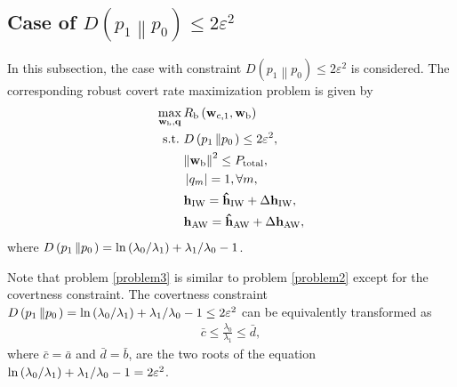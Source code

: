 \documentclass[10pt,journal,letterpaper,twocolumn,twoside]{IEEEtran} %
\begin{document}
\subsection{Case of $D\left( {{p_1}\left\| {{p_0}} \right.} \right) \le 2{\varepsilon ^2}$}
In this subsection, the case with constraint $D\left( {{p_1}\left\| {{p_0}} \right.} \right) \le 2{\varepsilon ^2}$ is considered. The   corresponding robust covert rate maximization problem is  given by
\begin{subequations}\label{problem3}
\begin{align}
\mathop {\max }\limits_{{{\bf{w}}_{\rm{b}}},{\bf{q}}} {\rm{ }}&{R_{\rm{b}}}\left( {{{\bf{w}}_{{\rm{c}},1}}},{{{\bf{w}}_{{\rm{b}}}}} \right) \hfill \\
  {\text{s}}{\text{.t}}{\text{.}}~&D\left( {{p_1}\left\| {{p_0}} \right.} \right) \le 2{\varepsilon ^2}, \hfill \label{problem3a}\\
 & {\left\| {{{\mathbf{w}}_{\rm{b}}}} \right\|^2} \le  {P_{{\rm{total}}}}, \hfill \label{problem3b}\\
 &\left| {{q_m}} \right| = 1,\forall m,\label{problem3c}\\
&{{\bf{h}}_{\rm{IW}}} = {{{\bf{\hat h}}}_{\rm{IW}}} + \Delta {{\bf{h}}_{\rm{IW}}},\label{problem3d}\\
 &{{\bf{h}}_{\rm{AW}}} = {{{\bf{\hat h}}}_{\rm{AW}}} + \Delta {{\bf{h}}_{\rm{AW}}},\label{problem3e}
\end{align}
\end{subequations}
where $D\left( {{p_1}\left\| {{p_0}} \right.} \right) = \ln \left( {{{{\lambda _0}} \mathord{\left/
 {\vphantom {{{\lambda _0}} {{\lambda _1}}}} \right.
 \kern-\nulldelimiterspace} {{\lambda _1}}}} \right) + {{{\lambda _{\rm{1}}}} \mathord{\left/
 {\vphantom {{{\lambda _{\rm{1}}}} {{\lambda _{\rm{0}}}}}} \right.
 \kern-\nulldelimiterspace} {{\lambda _{\rm{0}}}}} - 1$.

Note that problem \eqref{problem3}
 is similar to problem \eqref{problem2} except for the covertness constraint.
The covertness constraint $D\left( {{p_1}\left\| {{p_0}} \right.} \right) = \ln \left( {{{{\lambda _0}} \mathord{\left/
 {\vphantom {{{\lambda _0}} {{\lambda _1}}}} \right.
 \kern-\nulldelimiterspace} {{\lambda _1}}}} \right) + {{{\lambda _{\rm{1}}}} \mathord{\left/
 {\vphantom {{{\lambda _{\rm{1}}}} {{\lambda _{\rm{0}}}}}} \right.
 \kern-\nulldelimiterspace} {{\lambda _{\rm{0}}}}} - 1 \le 2{\varepsilon ^2}$ can be  equivalently transformed as
\begin{align}
\bar c \le \frac{{{\lambda _0}}}{{{\lambda _1}}} \le \bar d,
 \end{align}
 where $\bar c= {\bar a}$ and $\bar d= {\bar b}$, are the two roots of the equation $\ln \left( {{{{\lambda _0}} \mathord{\left/
 {\vphantom {{{\lambda _0}} {{\lambda _1}}}} \right.
 \kern-\nulldelimiterspace} {{\lambda _1}}}} \right) + {{{\lambda _{\rm{1}}}} \mathord{\left/
 {\vphantom {{{\lambda _{\rm{1}}}} {{\lambda _{\rm{0}}}}}} \right.
 \kern-\nulldelimiterspace} {{\lambda _{\rm{0}}}}} - 1 = 2{\varepsilon ^2}$.
\end{document}

